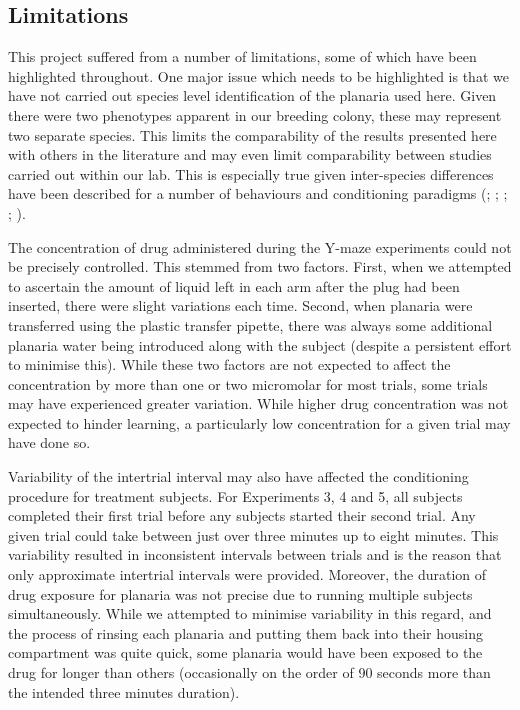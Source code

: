 \documentclass[
  jou,
  floatsintext,
  longtable,
  nolmodern,
  notxfonts,
  notimes,
  donotrepeattitle,
  colorlinks=true,linkcolor=blue,citecolor=blue,urlcolor=blue]{apa7}
\begin{document}
\subsection{Limitations}\label{sec-limitations}

This project suffered from a number of limitations, some of which have
been highlighted throughout. One major issue which needs to be
highlighted is that we have not carried out species level identification
of the planaria used here. Given there were two phenotypes apparent in
our breeding colony, these may represent two separate species. This
limits the comparability of the results presented here with others in
the literature and may even limit comparability between studies carried
out within our lab. This is especially true given inter-species
differences have been described for a number of behaviours and
conditioning paradigms
(; ;
;
;
).

The concentration of drug administered during the Y-maze experiments
could not be precisely controlled. This stemmed from two factors. First,
when we attempted to ascertain the amount of liquid left in each arm
after the plug had been inserted, there were slight variations each
time. Second, when planaria were transferred using the plastic transfer
pipette, there was always some additional planaria water being
introduced along with the subject (despite a persistent effort to
minimise this). While these two factors are not expected to affect the
concentration by more than one or two micromolar for most trials, some
trials may have experienced greater variation. While higher drug
concentration was not expected to hinder learning, a particularly low
concentration for a given trial may have done so.

Variability of the intertrial interval may also have affected the
conditioning procedure for treatment subjects. For Experiments 3, 4 and
5, all subjects completed their first trial before any subjects started
their second trial. Any given trial could take between just over three
minutes up to eight minutes. This variability resulted in inconsistent
intervals between trials and is the reason that only approximate
intertrial intervals were provided. Moreover, the duration of drug
exposure for planaria was not precise due to running multiple subjects
simultaneously. While we attempted to minimise variability in this
regard, and the process of rinsing each planaria and putting them back
into their housing compartment was quite quick, some planaria would have
been exposed to the drug for longer than others (occasionally on the
order of 90 seconds more than the intended three minutes duration).
\end{document}
